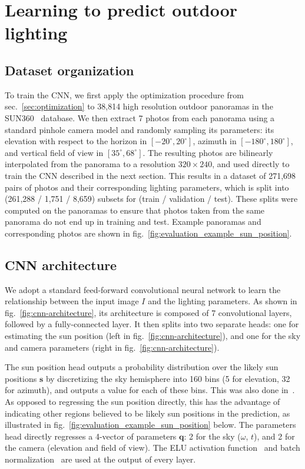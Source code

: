 \section{Learning to predict outdoor lighting}
\label{sec:cnn}

\subsection{Dataset organization}

To train the CNN, we first apply the optimization procedure from sec.~\ref{sec:optimization} to 38,814 high resolution outdoor panoramas in the SUN360~\cite{xiao-cvpr-12} database. We then extract 7 photos from each panorama using a standard pinhole camera model and randomly sampling its parameters: its elevation with respect to the horizon in $[-20^\circ, 20^\circ]$, azimuth in $[-180^\circ, 180^\circ]$, and vertical field of view in $[35^\circ, 68^\circ]$. The resulting photos are bilinearly interpolated from the panorama to a resolution $320 \times 240$, and used directly to train the CNN described in the next section. This results in a dataset of 271,698 pairs of photos and their corresponding lighting parameters, which is split into (261,288 / 1,751 / 8,659) subsets for (train / validation / test). These splits were computed on the panoramas to ensure that photos taken from the same panorama do not end up in training and test. Example panoramas and corresponding photos are shown in fig.~\ref{fig:evaluation_example_sun_position}. 

\subsection{CNN architecture}

We adopt a standard feed-forward convolutional neural network to learn the relationship between the input image $I$ and the lighting parameters. As shown in fig.~\ref{fig:cnn-architecture}, its architecture is composed of 7 convolutional layers, followed by a fully-connected layer. It then splits into two separate heads: one for estimating the sun position (left in fig.~\ref{fig:cnn-architecture}), and one for the sky and camera parameters (right in fig.~\ref{fig:cnn-architecture}). 

The sun position head outputs a probability distribution over the likely sun positions $\mathbf{s}$ by discretizing the sky hemisphere into 160 bins (5 for elevation, 32 for azimuth), and outputs a value for each of these bins. This was also done in~\cite{lalonde-ijcv-12}. As opposed to regressing the sun position directly, this has the advantage of indicating other regions believed to be likely sun positions in the prediction, as illustrated in fig.~\ref{fig:evaluation_example_sun_position} below. The parameters head directly regresses a 4-vector of parameters $\mathbf{q}$: 2 for the sky ($\omega$, $t$), and 2 for the camera (elevation and field of view). The ELU activation function~\cite{clevert-iclr-16} and batch normalization~\cite{ioffe-jmlr-15} are used at the output of every layer. 

